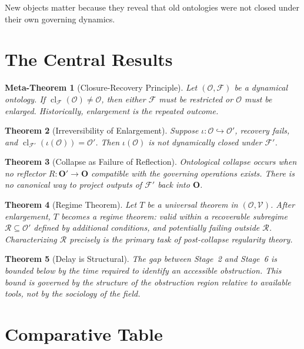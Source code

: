 \documentclass[12pt,oneside]{book}
\theoremstyle{plain}
\newtheorem{theorem}{Theorem}[chapter]
\newtheorem{metatheorem}[theorem]{Meta-Theorem}
\theoremstyle{definition}
\theoremstyle{remark}
\newcommand{\Oold}{\mathcal{O}}
\newcommand{\Onew}{\mathcal{O}'}
\newcommand{\F}{\mathcal{F}}
\newcommand{\cl}{\operatorname{cl}}
\newcommand{\bO}{\mathbf{O}}
\newcommand{\bOn}{\mathbf{O}'}
\begin{document}
\epigraph{New objects matter because they reveal that old ontologies
were not closed under their own governing dynamics.}{}

\section{The Central Results}

\begin{metatheorem}[Closure-Recovery Principle]
\label{meta:CRP-final}
Let $(\Oold, \F)$ be a dynamical ontology. If $\cl_\F(\Oold) \neq \Oold$,
then either $\F$ must be restricted or $\Oold$ must be enlarged.
Historically, enlargement is the repeated outcome.
\end{metatheorem}

\begin{theorem}[Irreversibility of Enlargement]
\label{thm:irrev-final}
Suppose $\iota : \Oold \hookrightarrow \Onew$, recovery fails, and
$\cl_{\F'}(\iota(\Oold)) = \Onew$. Then $\iota(\Oold)$ is not dynamically
closed under $\F'$.
\end{theorem}

\begin{theorem}[Collapse as Failure of Reflection]
Ontological collapse occurs when no reflector $R : \bOn \to \bO$ compatible
with the governing operations exists. There is no canonical way to project
outputs of $\F'$ back into $\bO$.
\end{theorem}

\begin{theorem}[Regime Theorem]
Let $T$ be a universal theorem in $(\Oold, \mathcal{V})$. After enlargement,
$T$ becomes a regime theorem: valid within a recoverable subregime
$\mathcal{R} \subseteq \Onew$ defined by additional conditions, and potentially
failing outside $\mathcal{R}$. Characterizing $\mathcal{R}$ precisely is the
primary task of post-collapse regularity theory.
\end{theorem}

\begin{theorem}[Delay is Structural]
The gap between Stage~2 and Stage~6 is bounded below by the time required
to identify an accessible obstruction. This bound is governed by the structure
of the obstruction region relative to available tools, not by the sociology
of the field.
\end{theorem}

\section{Comparative Table}
\end{document}
